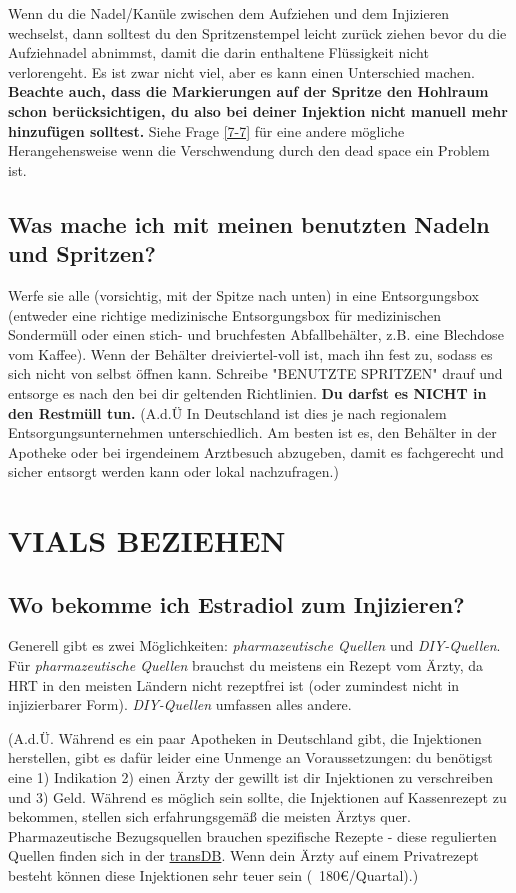 \documentclass{article}
\begin{document}
Wenn du die Nadel/Kanüle zwischen dem Aufziehen und dem Injizieren wechselst, dann solltest du den Spritzenstempel leicht zurück ziehen bevor du die Aufziehnadel abnimmst, damit die darin enthaltene Flüssigkeit nicht verlorengeht. Es ist zwar nicht viel, aber es kann einen Unterschied machen. \textbf{Beachte auch, dass die Markierungen auf der Spritze den Hohlraum schon berücksichtigen, du also bei deiner Injektion nicht manuell mehr hinzufügen solltest.} Siehe Frage \ref{7-7} für eine andere mögliche Herangehensweise wenn die Verschwendung durch den dead space ein Problem ist.

\subsection{Was mache ich mit meinen benutzten Nadeln und Spritzen?}\label{5-27}

Werfe sie alle (vorsichtig, mit der Spitze nach unten) in eine Entsorgungsbox (entweder eine richtige medizinische Entsorgungsbox für medizinischen Sondermüll oder einen stich- und bruchfesten Abfallbehälter, z.B. eine Blechdose vom Kaffee). Wenn der Behälter dreiviertel-voll ist, mach ihn fest zu, sodass es sich nicht von selbst öffnen kann. Schreibe "BENUTZTE SPRITZEN" drauf und entsorge es nach den bei dir geltenden Richtlinien. \textbf{Du darfst es NICHT in den Restmüll tun.} (A.d.Ü In Deutschland ist dies je nach regionalem Entsorgungsunternehmen unterschiedlich. Am besten ist es, den Behälter in der Apotheke oder bei irgendeinem Arztbesuch abzugeben, damit es fachgerecht und sicher entsorgt werden kann oder lokal nachzufragen.)

\section{VIALS BEZIEHEN}\label{sv}

\subsection{Wo bekomme ich Estradiol zum Injizieren?}

Generell gibt es zwei Möglichkeiten: \textit{pharmazeutische Quellen} und \textit{DIY-Quellen}. Für \textit{pharmazeutische Quellen} brauchst du meistens ein Rezept vom Ärzty, da HRT in den meisten Ländern nicht rezeptfrei ist (oder zumindest nicht in injizierbarer Form). \textit{DIY-Quellen} umfassen alles andere. 

(A.d.Ü. Während es ein paar Apotheken in Deutschland gibt, die Injektionen herstellen, gibt es dafür leider eine Unmenge an Voraussetzungen: du benötigst eine 1) Indikation 2) einen Ärzty der gewillt ist dir Injektionen zu verschreiben und 3) Geld. Während es möglich sein sollte, die Injektionen auf Kassenrezept zu bekommen, stellen sich erfahrungsgemäß die meisten Ärztys quer. Pharmazeutische Bezugsquellen brauchen spezifische Rezepte - diese regulierten Quellen finden sich in der \href{https://transdb.de/search?type=pharmacy&offers=eInjection}{trans\*DB}. Wenn dein Ärzty auf einem Privatrezept besteht können diese Injektionen sehr teuer sein (~180€/Quartal).)
\end{document}
